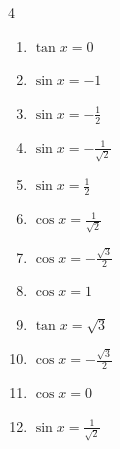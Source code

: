 \begin{multicols}{4}
\begin{enumerate}
  \item $\displaystyle \tan{x}  = 0$


  \item $\displaystyle \sin{x}  = -1$


  \item $\displaystyle \sin{x}  = -\frac{1}{2}$


  \item $\displaystyle \sin{x}  = -\frac{1}{\sqrt{2}}$


  \item $\displaystyle \sin{x}  = \frac{1}{2}$


  \item $\displaystyle \cos{x}  = \frac{1}{\sqrt{2}}$


  \item $\displaystyle \cos{x}  = -\frac{\sqrt{3}}{2}$


  \item $\displaystyle \cos{x}  = 1$


  \item $\displaystyle \tan{x}  = \sqrt{3}$


  \item $\displaystyle \cos{x}  = -\frac{\sqrt{3}}{2}$


  \item $\displaystyle \cos{x}  = 0$


  \item $\displaystyle \sin{x}  = \frac{1}{\sqrt{2}}$


\end{enumerate}
\end{multicols}
